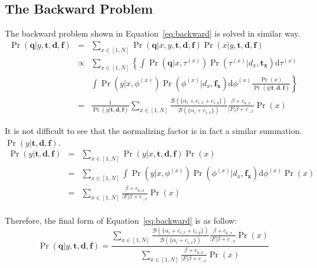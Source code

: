 \subsection{The Backward Problem}
The backward problem shown in Equation~\eqref{eq:backward} is solved in similar way.
\begin{eqnarray}
  \Pr(\mathbf{q}|y, \mathbf{t}, \mathbf{d}, \mathbf{f}) 
  &=& \sum_{x \in [1, N]} \Pr(\mathbf{q}|x, y, \mathbf{t}, \mathbf{d}, \mathbf{f}) \Pr(x|y, \mathbf{t}, \mathbf{d}, \mathbf{f}) \nonumber\\
  &\propto& \sum_{x \in [1, N]} \left\{ \int \Pr(\mathbf{q}|x, \tau^{(x)}) \Pr(\tau^{(x)}|d_x, \mathbf{t_x}) \mathrm{d}\tau^{(x)} \right. \nonumber\\
  && \left. \int \Pr(y| x, \phi^{(x)}) \Pr(\phi^{(x)}|d_x, \mathbf{f_x})\mathrm{d}\phi^{(x)} \frac{\Pr(x)}{\Pr(y|\mathbf{t}, \mathbf{d}, \mathbf{f})} \right\} \nonumber\\
  &=& \frac{1}{\Pr(y|\mathbf{t}, \mathbf{d}, \mathbf{f})} \sum_{x \in [1, N]} \frac{\mathcal{B}(\{\alpha_i + c_{i,x} + c_{i,q} \})}{\mathcal{B}(\{\alpha_i + c_{i,x} \})} \frac{\beta + c_{k,x}}{|F|\beta + c_{\cdot,x}} \Pr(x) \nonumber
\end{eqnarray}

It is not difficult to see that the normalizing factor is in fact a similar summation.
$\Pr(y|\mathbf{t}, \mathbf{d}, \mathbf{f})$.
\begin{eqnarray}
  \Pr(y|\mathbf{t}, \mathbf{d}, \mathbf{f})
  &=& \sum_{x \in [1, N]} \Pr(y|x, \mathbf{t}, \mathbf{d}, \mathbf{f}) \Pr(x) \nonumber\\
  &=& \sum_{x \in [1, N]} \int \Pr(y|x, \phi^{(x)}) \Pr(\phi^{(x)}|d_x, \mathbf{f_x}) \mathrm{d}\phi^{(x)} \Pr(x) \nonumber\\
  &=& \sum_{x \in [1, N]} \frac{\beta + c_{k,x}}{|F|\beta + c_{\cdot,x}} \Pr(x) \nonumber\\
\end{eqnarray}

Therefore, the final form of Equation~\eqref{eq:backward} is as follow:
\begin{equation}
  \Pr(\mathbf{q}|y, \mathbf{t}, \mathbf{d}, \mathbf{f}) = 
  \frac{\sum_{x \in [1, N]} \frac{\mathcal{B}(\{\alpha_i + c_{i,x} + c_{i,q} \})}{\mathcal{B}(\{\alpha_i + c_{i,x} \})} \frac{\beta + c_{k,x}}{|F|\beta + c_{\cdot,x}} \Pr(x)}
  {\sum_{x \in [1, N]} \frac{\beta + c_{k,x}}{|F|\beta + c_{\cdot,x}} \Pr(x)}
\end{equation}

